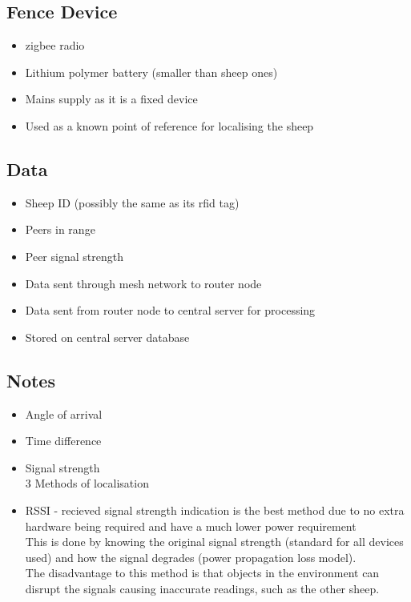 \documentclass{article}
\begin{document}
\subsection{Fence Device}
\begin{itemize}
\item zigbee radio
\item Lithium polymer battery (smaller than sheep ones)
\item Mains supply as it is a fixed device
\item Used as a known point of reference for localising the sheep
\end{itemize}

\subsection{Data}
\begin{itemize}
\item Sheep ID (possibly the same as its rfid tag)
\item Peers in range
\item Peer signal strength
\item Data sent through mesh network to router node
\item Data sent from router node to central server for processing
\item Stored on central server database
\end{itemize}

\subsection{Notes}
\begin{itemize}
\item Angle of arrival
\item Time difference
\item Signal strength
\\3 Methods of localisation
\item RSSI - recieved signal strength indication is the best method due to no extra hardware being required and have a much lower power requirement
\\This is done by knowing the original signal strength (standard for all devices used) and how the signal degrades (power propagation loss model).
\\The disadvantage to this method is that objects in the environment can disrupt the signals causing inaccurate readings, such as the other sheep.
\end{itemize}
\end{document}
